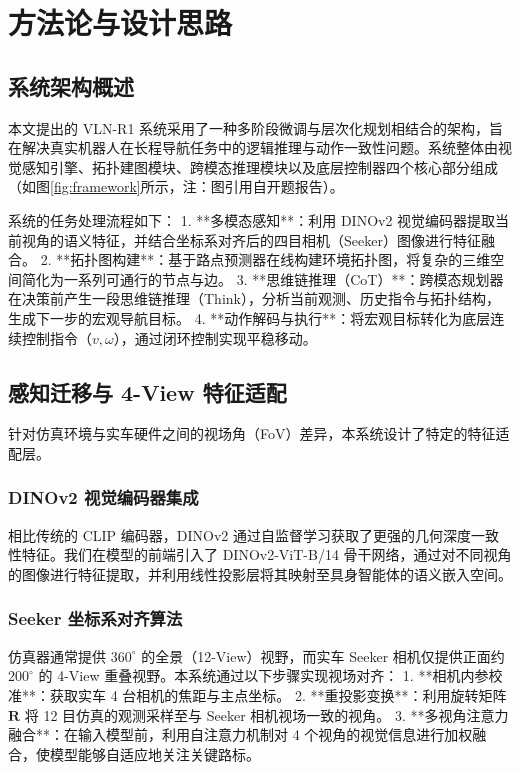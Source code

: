 \cleardoublepage

\section{方法论与设计思路}

\subsection{系统架构概述}
本文提出的 VLN-R1 系统采用了一种多阶段微调与层次化规划相结合的架构，旨在解决真实机器人在长程导航任务中的逻辑推理与动作一致性问题。系统整体由视觉感知引擎、拓扑建图模块、跨模态推理模块以及底层控制器四个核心部分组成（如图\ref{fig:framework}所示，注：图引用自开题报告）。

系统的任务处理流程如下：
1. **多模态感知**：利用 DINOv2 视觉编码器提取当前视角的语义特征，并结合坐标系对齐后的四目相机（Seeker）图像进行特征融合。
2. **拓扑图构建**：基于路点预测器在线构建环境拓扑图，将复杂的三维空间简化为一系列可通行的节点与边。
3. **思维链推理（CoT）**：跨模态规划器在决策前产生一段思维链推理（Think），分析当前观测、历史指令与拓扑结构，生成下一步的宏观导航目标。
4. **动作解码与执行**：将宏观目标转化为底层连续控制指令（$v, \omega$），通过闭环控制实现平稳移动。

\subsection{感知迁移与 4-View 特征适配}
针对仿真环境与实车硬件之间的视场角（FoV）差异，本系统设计了特定的特征适配层。
\subsubsection{DINOv2 视觉编码器集成}
相比传统的 CLIP 编码器，DINOv2 通过自监督学习获取了更强的几何深度一致性特征。我们在模型的前端引入了 DINOv2-ViT-B/14 骨干网络，通过对不同视角的图像进行特征提取，并利用线性投影层将其映射至具身智能体的语义嵌入空间。

\subsubsection{Seeker 坐标系对齐算法}
仿真器通常提供 $360^{\circ}$ 的全景（12-View）视野，而实车 Seeker 相机仅提供正面约 $200^{\circ}$ 的 4-View 重叠视野。本系统通过以下步骤实现视场对齐：
1. **相机内参校准**：获取实车 4 台相机的焦距与主点坐标。
2. **重投影变换**：利用旋转矩阵 $\mathbf{R}$ 将 12 目仿真的观测采样至与 Seeker 相机视场一致的视角。
3. **多视角注意力融合**：在输入模型前，利用自注意力机制对 4 个视角的视觉信息进行加权融合，使模型能够自适应地关注关键路标。

